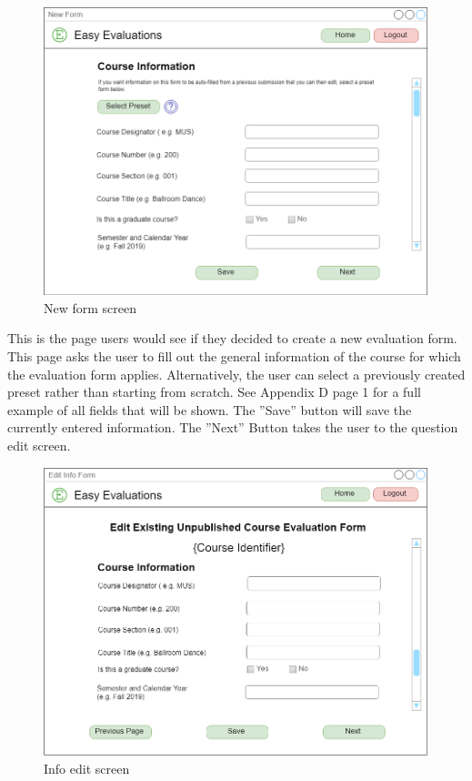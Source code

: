 \documentclass{article}
\begin{document}
\newpage

\begin{center}
\begin{figure}[H]
    \centering
    \caption{New form screen}
    \includegraphics[width=6.5in]{images/create_screen.png}
\end{figure}
\end{center}

This is the page users would see if they decided to create a new evaluation form. This page asks the user to fill out the general information of the course for which the evaluation form applies. Alternatively, the user can select a previously created preset rather than starting from scratch. See Appendix D page 1 for a full example of all fields that will be shown.  The ''Save'' button will save the currently entered information. The ''Next'' Button takes the user to the question edit screen.

\newpage

\begin{center}
\begin{figure}[H]
    \centering
    \caption{Info edit screen}
    \includegraphics[width=6.5in]{images/edit_info_screen.png}
\end{figure}
\end{center}
\end{document}
